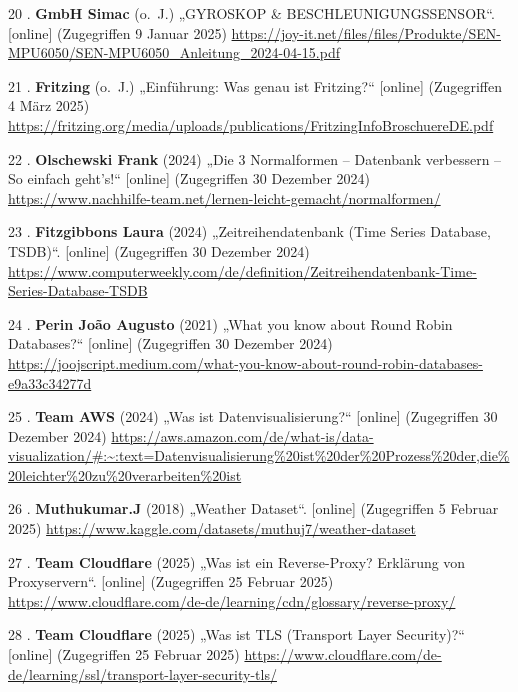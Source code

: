 \documentclass[
    headings=optiontotocandhead,%
    twoside,
    numbers=noenddot,%
    12pt, %
    titlepage, %
    parskip=full, %
    listof=leveldown, 
    numbers=noenddot, %
    a4paper,DIV=14,
    BCOR=15mm,
]{scrbook}
\newlength{\cslhangindent}
\newenvironment{cslreferences}%
  {\setlength{\parindent}{0pt}%
  \everypar{\setlength{\hangindent}{\cslhangindent}}\ignorespaces}%
  {\par}
\begin{document}
\begin{cslreferences}
\leavevmode\hypertarget{ref-MPU6050-Datenblatt}{}%
20 . \textbf{GmbH Simac} (o.~J.) „GYROSKOP \& BESCHLEUNIGUNGSSENSOR``.
{[}online{]} (Zugegriffen 9 Januar 2025)
\url{https://joy-it.net/files/files/Produkte/SEN-MPU6050/SEN-MPU6050_Anleitung_2024-04-15.pdf}

\leavevmode\hypertarget{ref-Was-ist-Fritzing}{}%
21 . \textbf{Fritzing} (o.~J.) „Einführung: Was genau ist Fritzing?{}``
{[}online{]} (Zugegriffen 4 März 2025)
\url{https://fritzing.org/media/uploads/publications/FritzingInfoBroschuereDE.pdf}

\leavevmode\hypertarget{ref-Nachhilfe-Team}{}%
22 . \textbf{Olschewski Frank} (2024) „Die 3 Normalformen -- Datenbank
verbessern -- So einfach geht's!{}`` {[}online{]} (Zugegriffen 30
Dezember 2024)
\url{https://www.nachhilfe-team.net/lernen-leicht-gemacht/normalformen/}

\leavevmode\hypertarget{ref-Computerweekly}{}%
23 . \textbf{Fitzgibbons Laura} (2024) „Zeitreihendatenbank (Time Series
Database, TSDB)``. {[}online{]} (Zugegriffen 30 Dezember 2024)
\url{https://www.computerweekly.com/de/definition/Zeitreihendatenbank-Time-Series-Database-TSDB}

\leavevmode\hypertarget{ref-joojscript}{}%
24 . \textbf{Perin João Augusto} (2021) „What you know about Round Robin
Databases?{}`` {[}online{]} (Zugegriffen 30 Dezember 2024)
\url{https://joojscript.medium.com/what-you-know-about-round-robin-databases-e9a33c34277d}

\leavevmode\hypertarget{ref-aws-datenvisualisierung}{}%
25 . \textbf{Team AWS} (2024) „Was ist Datenvisualisierung?{}``
{[}online{]} (Zugegriffen 30 Dezember 2024)
\url{https://aws.amazon.com/de/what-is/data-visualization/\#:~:text=Datenvisualisierung\%20ist\%20der\%20Prozess\%20der,die\%20leichter\%20zu\%20verarbeiten\%20ist}

\leavevmode\hypertarget{ref-kaggle-weather-data}{}%
26 . \textbf{Muthukumar.J} (2018) „Weather Dataset``. {[}online{]}
(Zugegriffen 5 Februar 2025)
\url{https://www.kaggle.com/datasets/muthuj7/weather-dataset}

\leavevmode\hypertarget{ref-reverse-proxy}{}%
27 . \textbf{Team Cloudflare} (2025) „Was ist ein Reverse-Proxy?
\textbar{} Erklärung von Proxyservern``. {[}online{]} (Zugegriffen 25
Februar 2025)
\url{https://www.cloudflare.com/de-de/learning/cdn/glossary/reverse-proxy/}

\leavevmode\hypertarget{ref-tls}{}%
28 . \textbf{Team Cloudflare} (2025) „Was ist TLS (Transport Layer
Security)?{}`` {[}online{]} (Zugegriffen 25 Februar 2025)
\url{https://www.cloudflare.com/de-de/learning/ssl/transport-layer-security-tls/}


\end{cslreferences}
\end{document}
